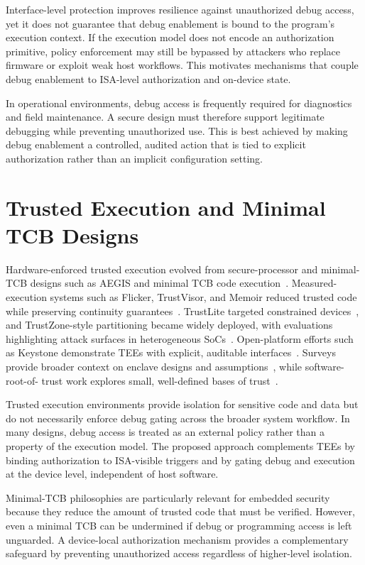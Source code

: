 Interface-level protection improves resilience against unauthorized debug access, yet it does not
guarantee that debug enablement is bound to the program’s execution context. If the execution
model does not encode an authorization primitive, policy enforcement may still be bypassed by
attackers who replace firmware or exploit weak host workflows. This motivates mechanisms that
couple debug enablement to ISA-level authorization and on-device state.

In operational environments, debug access is frequently required for diagnostics and field
maintenance. A secure design must therefore support legitimate debugging while preventing
unauthorized use. This is best achieved by making debug enablement a controlled, audited action
that is tied to explicit authorization rather than an implicit configuration setting.

\section{Trusted Execution and Minimal TCB Designs}
Hardware-enforced trusted execution evolved from secure-processor and minimal-TCB designs such as
AEGIS and minimal TCB code execution~\cite{suh2005aegis,mccune2007minimaltcb}. Measured-execution
systems such as Flicker, TrustVisor, and Memoir reduced trusted code while preserving continuity
guarantees~\cite{mccune2008flicker,mccune2010trustvisor,parno2011memoir}. TrustLite targeted
constrained devices~\cite{koeberl2014trustlite}, and TrustZone-style partitioning became widely
deployed, with evaluations highlighting attack surfaces in heterogeneous
SoCs~\cite{zhang2017trustzoneeval}. Open-platform efforts such as Keystone demonstrate TEEs with
explicit, auditable interfaces~\cite{lee2020keystone}. Surveys provide broader context on enclave
designs and assumptions~\cite{costan2017secureprocessors,ahmed2025riscvtee}, while software-root-of-
trust work explores small, well-defined bases of trust~\cite{gligor2019establishing}.

Trusted execution environments provide isolation for sensitive code and data but do not
necessarily enforce debug gating across the broader system workflow. In many designs, debug
access is treated as an external policy rather than a property of the execution model. The
proposed approach complements TEEs by binding authorization to ISA-visible triggers and by
gating debug and execution at the device level, independent of host software.

Minimal-TCB philosophies are particularly relevant for embedded security because they reduce the
amount of trusted code that must be verified. However, even a minimal TCB can be undermined if
debug or programming access is left unguarded. A device-local authorization mechanism provides a
complementary safeguard by preventing unauthorized access regardless of higher-level isolation.

